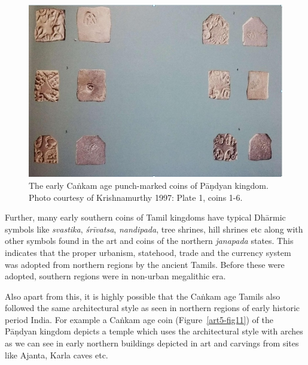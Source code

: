 \begin{figure}[!htbp]
\includegraphics{"images/article-05/art05-fig10.jpg"}
\caption{The early Caṅkam age punch-marked coins of Pāṇdyan kingdom. Photo courtesy of Krishnamurthy 1997: Plate 1, coins 1-6.}\label{art5-fig10}
\end{figure}

Further, many early southern coins of Tamil kingdoms have typical Dhārmic symbols like \textit{svastika}, \textit{śrīvatsa}, \textit{nandipada}, tree shrines, hill shrines etc along with other symbols found in the art and coins of the northern \textit{janapada} states. This indicates that the proper urbanism, statehood, trade and the currency system was adopted from northern regions by the ancient Tamils. Before these were adopted, southern regions were in non-urban megalithic era.

Also apart from this, it is highly possible that the Caṅkam age Tamils also followed the same architectural style as seen in northern regions of early historic period India. For example a Caṅkam age coin (Figure~\ref{art5-fig11}) of the Pāṇdyan kingdom depicts a temple which uses the architectural style with arches as we can see in early northern buildings depicted in art and carvings from sites like Ajanta, Karla caves etc.


